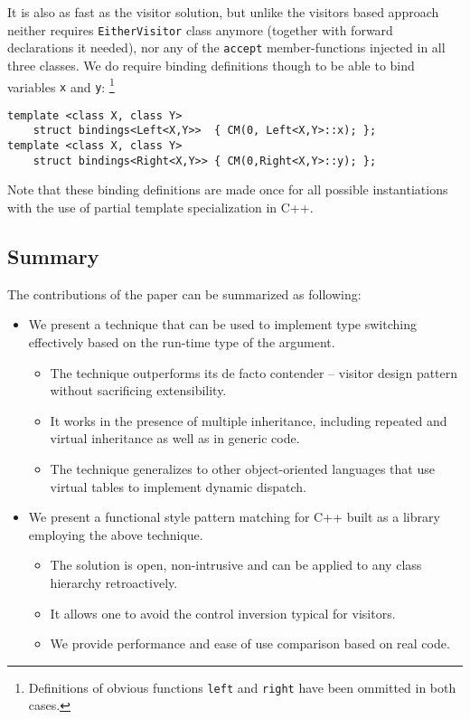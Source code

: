 \documentclass[preprint]{sigplanconf}
\DeclareRobustCommand{\code}[1]{{\lstinline[breaklines=false]{#1}}}
\begin{document}
It is also as fast as the visitor solution, but unlike the visitors based 
approach neither requires \code{EitherVisitor} class anymore (together with 
forward declarations it needed), nor any of the \code{accept} member-functions 
injected in all three classes. We do require binding definitions though to be 
able to bind variables \code{x} and \code{y}:
\footnote{Definitions of obvious functions \code{left} and \code{right} have 
been ommitted in both cases.}

\begin{lstlisting}[keepspaces,columns=flexible]
template <class X, class Y> 
    struct bindings<Left<X,Y>>  { CM(0, Left<X,Y>::x); };
template <class X, class Y> 
    struct bindings<Right<X,Y>> { CM(0,Right<X,Y>::y); };
\end{lstlisting}

Note that these binding definitions are made once for all possible instantiations 
with the use of partial template specialization in C++.

\subsection{Summary}

The contributions of the paper can be summarized as following:

\begin{itemize}
\item We present a technique that can be used to implement type switching 
      effectively based on the run-time type of the argument. 
  \begin{itemize}
  \item The technique outperforms its de facto contender -- visitor design 
        pattern without sacrificing extensibility.
  \item It works in the presence of multiple inheritance, including repeated and 
        virtual inheritance as well as in generic code.
  \item The technique generalizes to other object-oriented languages that use 
        virtual tables to implement dynamic dispatch.
  \end{itemize}
\item We present a functional style pattern matching for C++ built as a library 
      employing the above technique.
  \begin{itemize}
  \item The solution is open, non-intrusive and can be applied to any class 
        hierarchy retroactively.
  \item It allows one to avoid the control inversion typical for visitors.
  \item We provide performance and ease of use comparison based on real code.
  \end{itemize}
\end{itemize}
\end{document}
